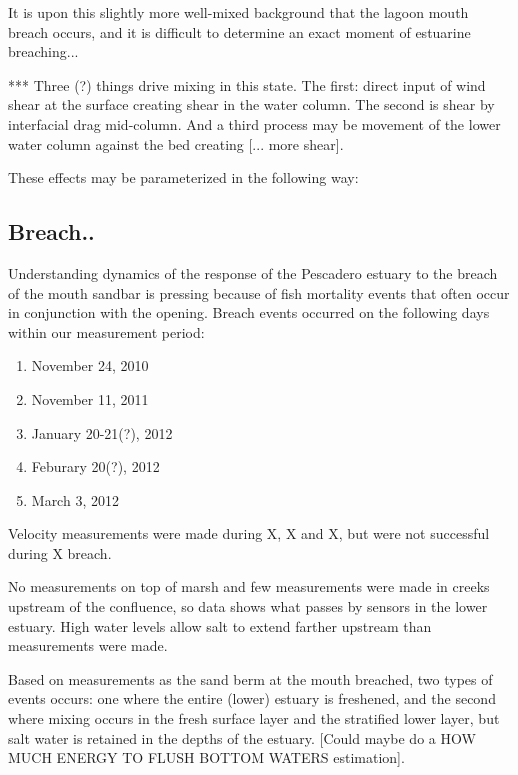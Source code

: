 It is upon this slightly more well-mixed background that the lagoon
mouth breach occurs, and it is difficult to determine an exact moment of
estuarine breaching...

*** Three (?) things drive mixing in this state. The first: direct input
of wind shear at the surface creating shear in the water column.  The
second is shear by interfacial drag mid-column. And a third process may
be movement of the lower water column against the bed creating [... more
shear].

These effects may be parameterized in the following way:



\subsection{Breach.. } \label{breach_dynamics}
Understanding dynamics of the response of the Pescadero estuary to the breach of the mouth sandbar is pressing because of fish mortality events that often occur in conjunction with the opening. Breach events occurred on the following days within our measurement period:
\begin{enumerate}
	\item November 24, 2010
	\item November 11, 2011
	\item January 20-21(?), 2012
	\item Feburary 20(?), 2012
	\item March 3, 2012
\end{enumerate}

Velocity measurements were made during X, X and X, but were not successful during X breach. 

No measurements on top of marsh and few measurements were made in
creeks upstream of the confluence, so data shows what passes by sensors in the lower estuary. High water
levels allow salt to extend farther upstream than measurements were made.

Based on measurements as the sand berm at the mouth breached, two types
of events occurs: one where the entire (lower) estuary is freshened, and
the second where mixing occurs in the fresh surface layer and the
stratified lower layer, but salt water is retained in the depths of the
estuary. [Could maybe do a HOW MUCH ENERGY TO FLUSH BOTTOM WATERS
estimation].


